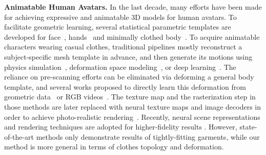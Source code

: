 \textbf{Animatable Human Avatars.} 
In the last decade, many efforts have been made for achieving expressive and animatable 3D models for human avatars. To facilitate geometric learning, several statistical parametric templates are developed for face~\cite{FLAME:SiggraphAsia2017}, hands~\cite{Romero2017MANO,Moon_2020_ECCV_DeepHandMesh} and minimally clothed body~\cite{loper2015smpl,STAR:2020,SMPL-X:2019,TotalCapture2018}. 
To acquire animatable characters wearing casual clothes, traditional pipelines mostly reconstruct a subject-specific mesh template in advance, and then generate its motions using physics simulation~\cite{Stoll2010Videobased,DRAPE2012}, deformation space modeling~\cite{TotalCapture2018}, or deep learning~\cite{habermann2021realtimeDDC,timur2021driving_signal,Xiang2021ModelingClothing}. The reliance on pre-scanning efforts can be eliminated via deforming a general body template, and several works proposed to directly learn this deformation from geometric data~\cite{CAPE:CVPR:20,pons2017clothcap,Ma:SCALE:2021,Ma:POP:2021} or RGB videos~\cite{alldieck2018videoavatar,alldieck2018videoavatar_detailed,alldieck2019tex2shape,alldieck19octopus}. The texture map and the rasterization step in those methods are later replaced with neural texture maps and image decoders in order to achieve photo-realistic rendering~\cite{Liu2018Neural,liu2020NeuralHumanRendering,Shysheya2019TNR,raj2020anr}. Recently, neural scene representations and rendering techniques are adopted for higher-fidelity results \cite{peng2021animatable_nerf,peng2021neuralbody,neural_actors}. However, state-of-the-art methods only demonstrate results of tightly-fitting garments, while our method is more general in terms of clothes topology and deformation. 
